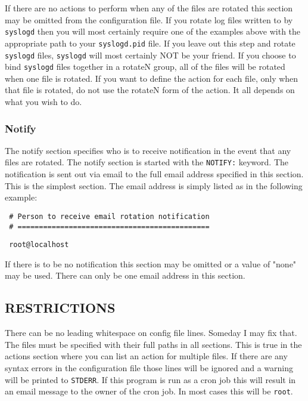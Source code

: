 \documentclass{article}
\begin{document}
If there are no actions to perform when any of the files are rotated
this section may be omitted from the configuration file.  If you rotate
log files written to by {\tt syslogd} then you will most certainly require
one of the examples above with the appropriate path to your
{\tt syslogd.pid} file.  If you leave out this step and rotate {\tt syslogd}
files, {\tt syslogd} will most certainly NOT be your friend.  If you choose
to bind {\tt syslogd} files together in a rotateN group, all of the files
will be rotated when one file is rotated.  If you want to define the
action for each file, only when that file is rotated, do not use the
rotateN form of the action.  It all depends on what you wish to do.

\subsubsection*{Notify}%

The notify section specifies who is to receive notification in the event
that any files are rotated.  The notify section is started with the
{\tt NOTIFY:} keyword.  The notification is sent out via email to the full
email address specified in this section.  This is the simplest section.
The email address is simply listed as in the following example:
\begin{verbatim}
 # Person to receive email rotation notification
 # =============================================
\end{verbatim}
\begin{verbatim}
 root@localhost
\end{verbatim}

If there is to be no notification this section may be omitted or a value
of "none" may be used.  There can only be one email address in this
section.

\subsection*{RESTRICTIONS}%

There can be no leading whitespace on config file lines.  Someday I may
fix that.  The files must be specified with their full paths in all
sections.  This is true in the actions section where you can list an
action for multiple files.  If there are any syntax errors in the
configuration file those lines will be ignored and a warning will be
printed to {\tt STDERR}.  If this program is run as a cron job this will
result in an email message to the owner of the cron job.  In most cases
this will be {\tt root}.
\end{document}
